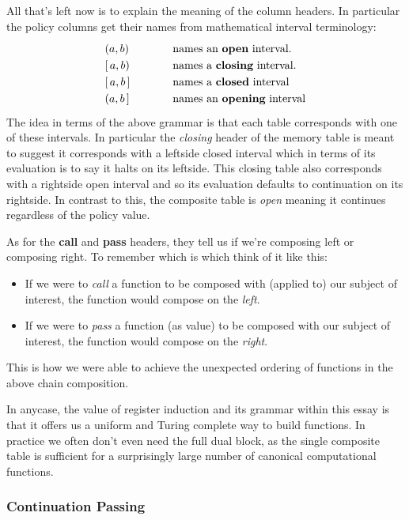 \documentclass[twoside]{article}
\newcommand{\strong}[1]{{\bfseries #1}}
\newcommand{\col}[1][0ex]{& \hspace{#1}}
\begin{document}
All that's left now is to explain the meaning of the column headers.
In particular the policy columns get their names from mathematical interval terminology:
$$ \def\arraystretch{1.25}
\begin{array}{ll}
(a, b)		\col[1cm] \mbox{names an \strong{open} interval.}		\\{} %
[\,a, b)	\col[1cm] \mbox{names a \strong{closing} interval.}		\\{} %
[\,a, b\,]	\col[1cm] \mbox{names a \strong{closed} interval}		\\
(a, b\,]	\col[1cm] \mbox{names an \strong{opening} interval}
\end{array} $$
The idea in terms of the above grammar is that each table corresponds with one of these intervals. In particular the
\emph{closing} header of the memory table is meant to suggest it corresponds with a leftside closed interval which in
terms of its evaluation is to say it halts on its leftside. This closing table also corresponds with a rightside open
interval and so its evaluation defaults to continuation on its rightside. In contrast to this, the composite table is
\emph{open} meaning it continues regardless of the policy value.

As for the \strong{call} and \strong{pass} headers, they tell us if we're composing left or composing right.
To remember which is which think of it like this:
\begin{itemize}
\item If we were to \emph{call} a function to be composed with (applied to) our subject of interest, the function would
      compose on the \emph{left}.
\item If we were to \emph{pass} a function (as value) to be composed with our subject of interest, the function would
      compose on the \emph{right}.
\end{itemize}
This is how we were able to achieve the unexpected ordering of functions in the above chain composition.

In anycase, the value of register induction and its grammar within this essay is that it offers us a uniform and Turing
complete way to build functions. In practice we often don't even need the full dual block, as the single composite table
is sufficient for a surprisingly large number of canonical computational functions.

\subsubsection*{Continuation Passing}
\end{document}
